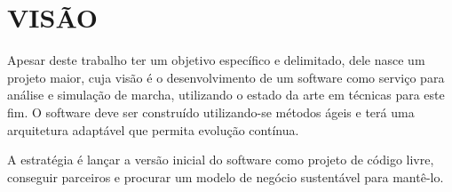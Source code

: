 \section[VISÃO]{VISÃO} 
Apesar deste trabalho ter um objetivo específico e delimitado, dele nasce um projeto maior, cuja visão é o desenvolvimento de um software como serviço para análise e simulação de marcha, utilizando o estado da arte em técnicas para este fim. 
O software deve ser construído utilizando-se métodos ágeis e terá uma arquitetura adaptável que permita evolução contínua.

A estratégia é lançar a versão inicial do software como projeto de código livre, conseguir parceiros e procurar um modelo de negócio sustentável para mantê-lo.
